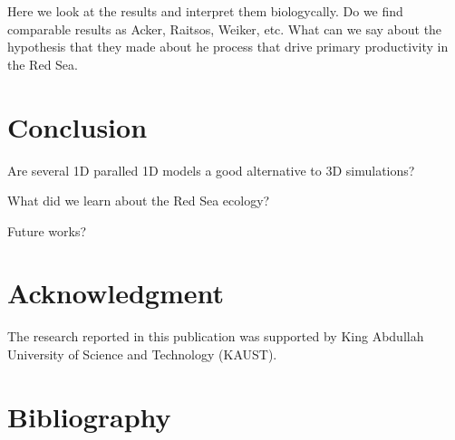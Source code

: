 \documentclass[12pt]{elsarticle}
\begin{document}
Here we look at the results and interpret them biologycally. Do we find
comparable results as Acker, Raitsos, Weiker, etc. What can we say about the
hypothesis that they made about he process that drive primary productivity in
the Red Sea.

\section{Conclusion}

Are several 1D paralled 1D models a good alternative to 3D simulations?

What did we learn about the Red Sea ecology?

Future works?

\section*{Acknowledgment}

The research reported in this publication was supported by King Abdullah
University of Science and Technology (KAUST).

\section{Bibliography}

 
\end{document}
